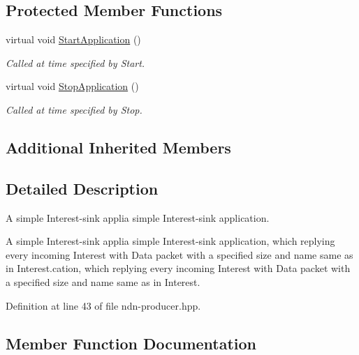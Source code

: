 \subsection*{Protected Member Functions}
\begin{DoxyCompactItemize}
\item 
virtual void \hyperlink{classns3_1_1ndn_1_1Producer_a2b2bbfe6920ef8f3e67296398287d5f9}{Start\+Application} ()\hypertarget{classns3_1_1ndn_1_1Producer_a2b2bbfe6920ef8f3e67296398287d5f9}{}\label{classns3_1_1ndn_1_1Producer_a2b2bbfe6920ef8f3e67296398287d5f9}

\begin{DoxyCompactList}\small\item\em Called at time specified by Start. \end{DoxyCompactList}\item 
virtual void \hyperlink{classns3_1_1ndn_1_1Producer_afff9238cb079fde2dea5c39231fe0e15}{Stop\+Application} ()\hypertarget{classns3_1_1ndn_1_1Producer_afff9238cb079fde2dea5c39231fe0e15}{}\label{classns3_1_1ndn_1_1Producer_afff9238cb079fde2dea5c39231fe0e15}

\begin{DoxyCompactList}\small\item\em Called at time specified by Stop. \end{DoxyCompactList}\end{DoxyCompactItemize}
\subsection*{Additional Inherited Members}


\subsection{Detailed Description}
A simple Interest-\/sink applia simple Interest-\/sink application. 

A simple Interest-\/sink applia simple Interest-\/sink application, which replying every incoming Interest with Data packet with a specified size and name same as in Interest.\+cation, which replying every incoming Interest with Data packet with a specified size and name same as in Interest. 

Definition at line 43 of file ndn-\/producer.\+hpp.



\subsection{Member Function Documentation}
